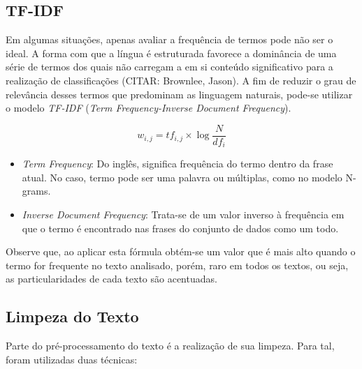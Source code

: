 \subsection{TF-IDF}

Em algumas situações, apenas avaliar a frequência de termos pode não ser o ideal. A forma com que a língua é estruturada favorece a dominância de uma série de termos dos quais não carregam a em si conteúdo significativo para a realização de classificações (CITAR: Brownlee, Jason). A fim de reduzir o grau de relevância desses termos que predominam as linguagem naturais, pode-se utilizar o modelo \textit{TF-IDF} (\textit{Term Frequency-Inverse Document Frequency}).

\begin{equation}
w_{i,j} = tf_{i,j}\times\log \frac{N}{df_i}
\end{equation}

\begin{itemize}
\item \textit{Term Frequency}: Do inglês, significa frequência do termo dentro da frase atual. No caso, termo pode ser uma palavra ou múltiplas, como no modelo N-grams.
\item \textit{Inverse Document Frequency}: Trata-se de um valor inverso à frequência em que o termo é encontrado nas frases do conjunto de dados como um todo.
\end{itemize}

Observe que, ao aplicar esta fórmula obtém-se um valor que é mais alto quando o termo for frequente no texto analisado, porém, raro em todos os textos, ou seja, as particularidades de cada texto são acentuadas.

\subsection{Limpeza do Texto}

Parte do pré-processamento do texto é a realização de sua limpeza. Para tal, foram utilizadas duas técnicas:

